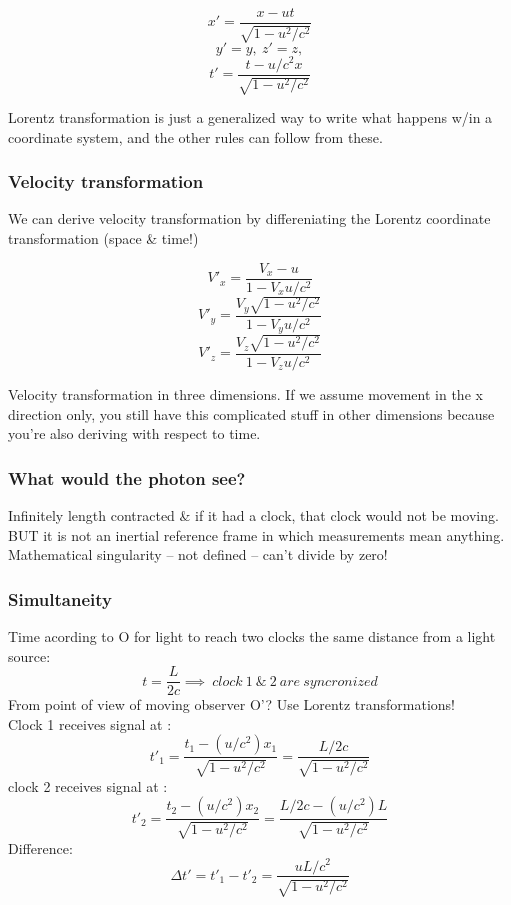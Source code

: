 \documentclass[class=article,crop=false]{standalone}
\begin{document}
$$ x' = \frac{x - ut}{\sqrt{1-u^2/c^2}} $$
$$ y' = y,\ z' = z, $$ 
$$ t' = \frac{t- u/c^2 x}{\sqrt{1-u^2/c^2}} $$

Lorentz transformation is just a generalized way to write what happens w/in a coordinate system, and the other rules can follow from these. \\

\subsubsection{Velocity transformation}
We can derive velocity transformation by differeniating the Lorentz coordinate transformation (space \& time!) \\
\begin{result}
	$$ V'_x = \frac{V_x - u}{1-V_x u/c^2} $$
	$$ V'_y = \frac{V_y \sqrt{1-u^2/c^2}}{1-V_y u/c^2} $$
	$$ V'_z = \frac{V_z \sqrt{1-u^2/c^2}}{1-V_z u/c^2} $$

Velocity transformation in three dimensions. If we assume movement in the x direction only, you still have this complicated stuff in other dimensions because you're also deriving with respect to time.
\end{result}

\subsubsection{What would the photon see?}
Infinitely length contracted \& if it had a clock, that clock would not be moving. BUT it is not an inertial reference frame in which measurements mean anything. Mathematical singularity -- not defined -- can't divide by zero!

\subsubsection{Simultaneity}
Time acording to O for light to reach two clocks the same distance from a light source:
$$ t = \frac{L}{2c} \implies\ clock\ 1\ \&\ 2\ are\ syncronized $$
From point of view of moving observer O'? Use Lorentz transformations!\\
Clock 1 receives signal at : \\
$$ t'_1 = \frac{t_1 - (u/c^2)x_1}{\sqrt{1-u^2/c^2}} = \frac{L/2c}{\sqrt{1-u^2/c^2}} $$
clock 2 receives signal at : \\
$$ t'_2 = \frac{t_2 - (u/c^2)x_2}{\sqrt{1-u^2/c^2}} = \frac{L/2c - (u/c^2)L}{\sqrt{1-u^2/c^2}} $$
Difference:
$$ \Delta t' = t'_1 - t'_2 = \frac{uL/c^2}{\sqrt{1-u^2/c^2}} $$
\end{document}
